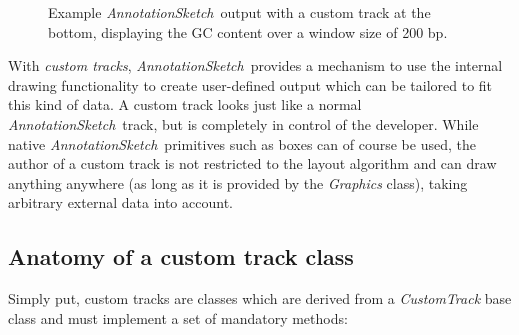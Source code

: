 \documentclass[a4paper]{scrreprt}
\newcommand{\AnnotationSketch}{\emph{AnnotationSketch}\ }
\begin{document}
\begin{figure}[ht]
\caption{Example \AnnotationSketch output with a custom track at the bottom, displaying the GC content over a window size of 200 bp.}
\label{ctexample1}
\end{figure}

With \emph{custom tracks}, \AnnotationSketch provides a mechanism to use the internal drawing functionality to create user-defined output which can be tailored to fit this kind of data. A custom track looks just like a normal \AnnotationSketch track, but is completely in control of the developer. While native \AnnotationSketch primitives such as boxes can of course be used, the author of a custom track is not restricted to the layout algorithm and can draw anything anywhere (as long as it is provided by the \emph{Graphics} class), taking arbitrary external data into account.

\subsection{Anatomy of a custom track class}

Simply put, custom tracks are classes which are derived from a \emph{CustomTrack} base class and must implement a set of mandatory methods:
\end{document}
